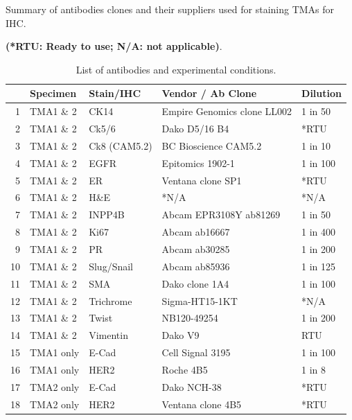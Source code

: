 \begin{table}
\centering
\caption{List of antibodies and experimental conditions.}
Summary of antibodies clones and their suppliers used for staining TMAs for IHC.

\small\textbf{(*RTU: Ready to use; N/A: not applicable)}.
\label{stab:antibodieslist}
\begin{tabular}{|rl|l|l|l|}
  \hline
 & Specimen & Stain/IHC & Vendor / Ab Clone & Dilution  \\ 
  \hline
1 & TMA1 \& 2 & CK14 & Empire Genomics clone LL002 & 1 in 50 \\ 
  2 & TMA1 \& 2 & Ck5/6 & Dako D5/16 B4 & *RTU  \\ 
  3 & TMA1 \& 2 & Ck8 (CAM5.2) & BC Bioscience CAM5.2 & 1 in 10  \\ 
  4 & TMA1 \& 2 & EGFR & Epitomics 1902-1 & 1 in 100  \\ 
  5 & TMA1 \& 2 & ER & Ventana  clone SP1 & *RTU\\ 
  6 & TMA1 \& 2 & H\&E & *N/A & *N/A \\ 
  7 & TMA1 \& 2 & INPP4B & Abcam EPR3108Y ab81269 & 1 in 50 \\ 
  8 & TMA1 \& 2 & Ki67 & Abcam ab16667  & 1 in 400  \\ 
  9 & TMA1 \& 2 & PR & Abcam ab30285 & 1 in 200  \\ 
  10 & TMA1 \& 2 & Slug/Snail & Abcam ab85936 & 1 in 125 \\ 
  11 & TMA1 \& 2 & SMA & Dako clone 1A4 & 1 in 100 \\ 
  12 & TMA1 \& 2 & Trichrome & Sigma-HT15-1KT & *N/A \\ 
  13 & TMA1 \& 2 & Twist & NB120-49254 & 1 in 200\\ 
  14 & TMA1 \& 2 & Vimentin & Dako V9 & RTU  \\ 
  15 & TMA1 only & E-Cad & Cell Signal 3195 & 1 in 100  \\ 
  16 & TMA1 only & HER2 & Roche 4B5 & 1 in 8  \\ 
  17 & TMA2 only & E-Cad & Dako NCH-38 & *RTU  \\ 
  18 & TMA2 only & HER2 & Ventana  clone 4B5 & *RTU \\ 
   \hline
\end{tabular}%
\end{table}


